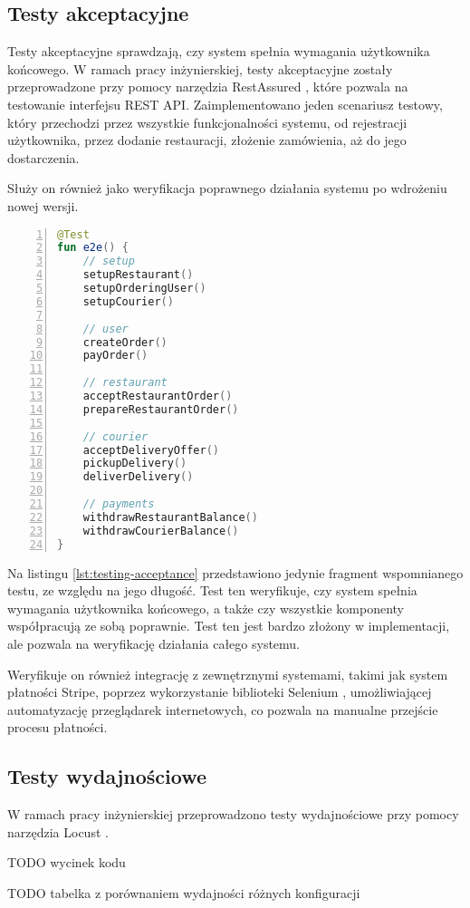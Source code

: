 \subsection{Testy akceptacyjne}

Testy akceptacyjne sprawdzają, czy system spełnia wymagania użytkownika końcowego. W ramach pracy inżynierskiej, testy akceptacyjne zostały przeprowadzone przy pomocy narzędzia RestAssured \cite{restassured}, które pozwala na testowanie interfejsu REST API. Zaimplementowano jeden scenariusz testowy, który przechodzi przez wszystkie funkcjonalności systemu, od rejestracji użytkownika, przez dodanie restauracji, złożenie zamówienia, aż do jego dostarczenia.

Służy on również jako weryfikacja poprawnego działania systemu po wdrożeniu nowej wersji.

\begin{lstlisting}[caption={Scenariusz testowy w ramach testów akceptacyjnych},label={lst:testing-acceptance},captionpos=b,language=Kotlin,numbers=left]
@Test
fun e2e() {
    // setup
    setupRestaurant()
    setupOrderingUser()
    setupCourier()

    // user
    createOrder()
    payOrder()

    // restaurant
    acceptRestaurantOrder()
    prepareRestaurantOrder()

    // courier
    acceptDeliveryOffer()
    pickupDelivery()
    deliverDelivery()

    // payments
    withdrawRestaurantBalance()
    withdrawCourierBalance()
}
\end{lstlisting}

Na listingu \ref{lst:testing-acceptance} przedstawiono jedynie fragment wspomnianego testu, ze względu na jego długość. Test ten weryfikuje, czy system spełnia wymagania użytkownika końcowego, a także czy wszystkie komponenty współpracują ze sobą poprawnie. Test ten jest bardzo złożony w implementacji, ale pozwala na weryfikację działania całego systemu.

Weryfikuje on również integrację z zewnętrznymi systemami, takimi jak system płatności Stripe, poprzez wykorzystanie biblioteki Selenium \cite{selenium}, umożliwiającej automatyzację przeglądarek internetowych, co pozwala na manualne przejście procesu płatności.

\subsection{Testy wydajnościowe}

W ramach pracy inżynierskiej przeprowadzono testy wydajnościowe przy pomocy narzędzia Locust \cite{locust}.

TODO wycinek kodu

TODO tabelka z porównaniem wydajności różnych konfiguracji